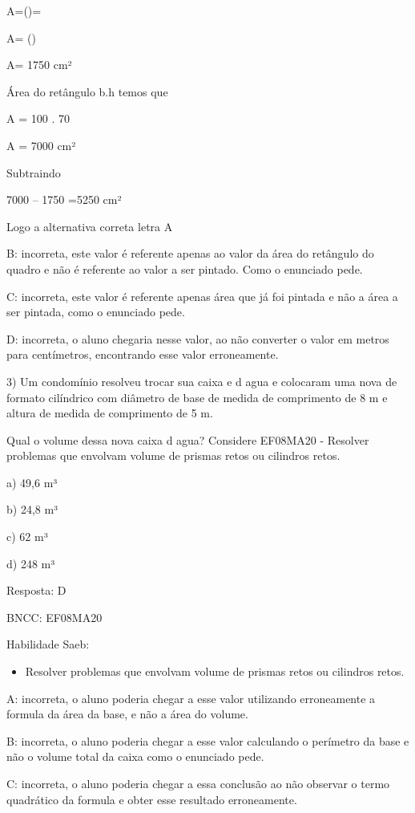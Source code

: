 
A=()=

A= ()

A= 1750 cm²

Área do retângulo b.h temos que

A = 100 . 70

A = 7000 cm²

Subtraindo

7000 -- 1750 =5250 cm²

Logo a alternativa correta letra A

B: incorreta, este valor é referente apenas ao valor da área do
retângulo do quadro e não é referente ao valor a ser pintado. Como o
enunciado pede.

C: incorreta, este valor é referente apenas área que já foi pintada e
não a área a ser pintada, como o enunciado pede.

D: incorreta, o aluno chegaria nesse valor, ao não converter o valor em
metros para centímetros, encontrando esse valor erroneamente.

3) Um condomínio resolveu trocar sua caixa e d agua e colocaram uma nova
de formato cilíndrico com diâmetro de base de medida de comprimento de 8
m e altura de medida de comprimento de 5 m.

Qual o volume dessa nova caixa d agua? Considere 
EF08MA20 - Resolver problemas que envolvam volume de prismas retos ou
cilindros retos.

a) 49,6 m³

b) 24,8 m³

c) 62 m³

d) 248 m³

Resposta: D

BNCC: EF08MA20

Habilidade Saeb:

\begin{itemize}
\tightlist
\item
  Resolver problemas que envolvam volume de prismas retos ou cilindros
  retos.
\end{itemize}

A: incorreta, o aluno poderia chegar a esse valor utilizando
erroneamente a formula da área da base, e não a área do volume.

B: incorreta, o aluno poderia chegar a esse valor calculando o perímetro
da base e não o volume total da caixa como o enunciado pede.

C: incorreta, o aluno poderia chegar a essa conclusão ao não observar o
termo quadrático da formula e obter esse resultado erroneamente.

